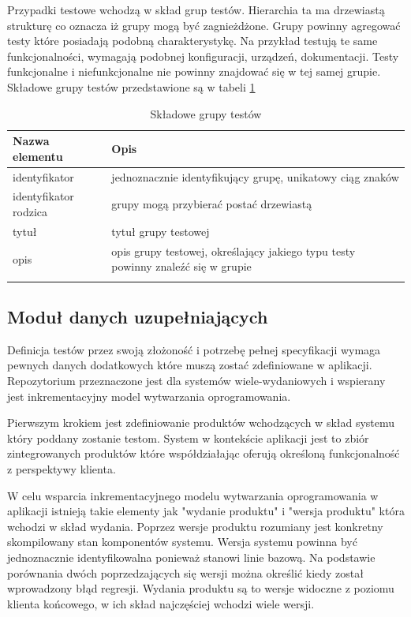 Przypadki testowe wchodzą w skład grup testów. Hierarchia ta ma drzewiastą strukturę co oznacza iż grupy mogą być zagnieżdżone. Grupy powinny agregować testy które posiadają podobną charakterystykę. Na przykład testują te same funkcjonalności, wymagają podobnej konfiguracji, urządzeń, dokumentacji. Testy funkcjonalne i niefunkcjonalne nie powinny znajdować się w tej samej grupie. Składowe grupy testów przedstawione są w tabeli \ref{tab:grupaTestow}

\begin{longtable}{| p{6cm}  | p{10cm} |}
 \hline \hline
\textbf{Nazwa elementu} & \textbf{Opis}  \\ \hline
  identyfikator & jednoznacznie identyfikujący grupę, unikatowy ciąg znaków \\ \hline
  identyfikator rodzica & grupy mogą przybierać postać drzewiastą \\ \hline
  tytuł & tytuł grupy testowej \\ \hline
  opis & opis grupy testowej, określający jakiego typu testy powinny znaleźć się w grupie \\ \hline
 \caption{ Składowe grupy testów}
 \label{tab:grupaTestow}
\end{longtable}


\subsection{Moduł danych uzupełniających}

Definicja testów przez swoją złożoność i potrzebę pełnej specyfikacji wymaga pewnych danych dodatkowych które muszą zostać zdefiniowane w aplikacji. Repozytorium przeznaczone jest dla systemów wiele-wydaniowych i wspierany jest inkrementacyjny model wytwarzania oprogramowania.

Pierwszym krokiem jest zdefiniowanie produktów wchodzących w skład systemu który poddany zostanie testom. System w kontekście aplikacji jest to zbiór zintegrowanych produktów które współdziałając oferują określoną funkcjonalność z perspektywy klienta.

W celu wsparcia inkrementacyjnego modelu wytwarzania oprogramowania w aplikacji istnieją takie elementy jak "wydanie produktu" i "wersja produktu" która wchodzi w skład wydania. Poprzez wersje produktu rozumiany jest konkretny skompilowany stan komponentów systemu. Wersja systemu powinna być jednoznacznie identyfikowalna ponieważ stanowi linie bazową. Na podstawie porównania dwóch poprzedzających się wersji można określić kiedy został wprowadzony błąd regresji. Wydania produktu są to wersje widoczne z poziomu klienta końcowego, w ich skład najczęściej wchodzi wiele wersji.

